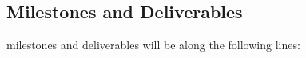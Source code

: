 \subsection{Milestones and Deliverables}

\pro milestones and deliverables will be along the following lines:




